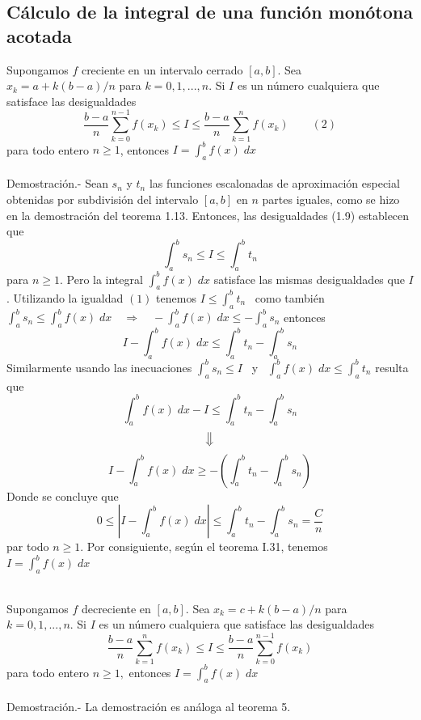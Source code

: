 \begin{multicols}{2}
\section*{Cálculo de la integral de una función monótona acotada}

\begin{teo} Supongamos $f$ creciente en un intervalo cerrado $[a,b]$. Sea $x_k = a + k(b-a)/n$ para $k=0,1,...,n$. Si $I$ es un número cualquiera que satisface las desigualdades $$\dfrac{b-a}{n}\sum\limits_{k=0}^{n-1} f(x_k)\leq I \leq \dfrac{b-a}{n}\sum\limits_{k=1}^n f(x_k) \qquad (2)$$
    para todo entero $n\geq 1$, entonces $I=\int_a^b f(x) \; dx$\\\\
    Demostración.-\; Sean $s_n$ y $t_n$ las funciones escalonadas de aproximación especial obtenidas por subdivisión del intervalo $[a,b]$ en $n$ partes iguales, como se hizo en la demostración del teorema 1.13. Entonces, las desigualdades (1.9) establecen que $$\int_a^b s_n \leq I \leq \int_a^b t_n$$
    para $n\geq 1$. Pero la integral $\int_a^b f(x) \; dx$ satisface las mismas desigualdades que $I$. Utilizando la igualdad $(1)$ tenemos $I\leq \int_a^b t_n$ \, como también \, $\int_a^b s_n \leq \int_a^b f(x) \; dx \quad \Longrightarrow\quad  - \int_a^b f(x) \; dx \leq -\int_a^b s_n$ entonces $$I-\int_a^b f(x)\; dx \leq \int_a^b t_n - \int_a^b s_n$$
    Similarmente usando las inecuaciones $\int_a^b s_n \leq I$ \, y \, $\int_a^b f(x) \; dx \leq \int_a^b t_n$ resulta que $$\int_a^b f(x) \; dx - I \leq \int_a^b t_n - \int_a^b s_n $$ $$\big\Downarrow$$ $$  I - \int_a^b f(x) \; dx \geq - \left(\int_a^b t_n - \int_a^b s_n\right)$$ 
    Donde se concluye que $$0\leq \left| I - \int_a^b f(x) \; dx \right| \leq \int_a^b t_n - \int_a^b s_n = \dfrac{C}{n}$$
    par todo $n\geq 1$. Por consiguiente, según el teorema I.31, tenemos $I=\int_a^b f(x) \; dx$\\\\
\end{teo}

\begin{teo} Supongamos $f$ decreciente en $[a,b]$. Sea $x_k=c+k(b-a)/n$ para $k=0,1,...,n$. Si $I$ es un número cualquiera que satisface las desigualdades $$\dfrac{b-a}{n} \sum\limits_{k=1}^n f(x_k) \leq I \leq \dfrac{b-a}{n} \sum\limits_{k=0}^{n-1} f(x_k)$$
    para todo entero $n\geq 1,$ entonces $I=\int_a^b f(x) \; dx$\\\\
    Demostración.-\; La demostración es análoga al teorema 5.
\end{teo}



\end{multicols}
